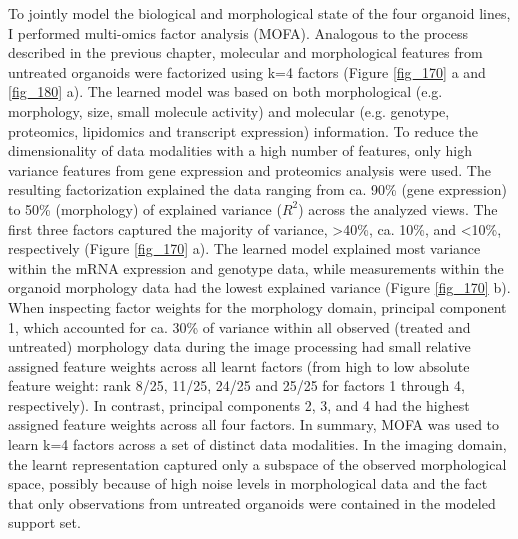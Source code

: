 \begin{flushleft}
To jointly model the biological and morphological state of the four organoid lines, I performed multi-omics factor analysis (MOFA). Analogous to the process described in the previous chapter, molecular and morphological features from untreated organoids were factorized using k=4 factors (Figure \ref{fig_170} a and \ref{fig_180} a). The learned model was based on both morphological (e.g. morphology, size, small molecule activity) and molecular (e.g. genotype, proteomics, lipidomics and transcript expression) information. To reduce the dimensionality of data modalities with a high number of features, only high variance features from gene expression and proteomics analysis were used. The resulting factorization explained the data ranging from ca. 90\% (gene expression) to 50\% (morphology) of explained variance ($R^{2}$) across the analyzed views. The first three factors captured the majority of variance, >40\%, ca. 10\%, and <10\%, respectively (Figure \ref{fig_170} a). The learned model explained most variance within the mRNA expression and genotype data, while measurements within the organoid morphology data had the lowest explained variance (Figure \ref{fig_170} b). When inspecting factor weights for the morphology domain, principal component 1, which accounted for ca. 30\% of variance within all observed (treated and untreated) morphology data during the image processing had small relative assigned feature weights across all learnt factors (from high to low absolute feature weight: rank 8/25, 11/25, 24/25 and 25/25 for factors 1 through 4, respectively). In contrast, principal components 2, 3, and 4 had the highest assigned feature weights across all four factors. In summary, MOFA was used to learn k=4 factors across a set of distinct data modalities. In the imaging domain, the learnt representation captured only a subspace of the observed morphological space, possibly because of high noise levels in morphological data and the fact that only observations from untreated organoids were contained in the modeled support set. 
\par


\end{flushleft}
